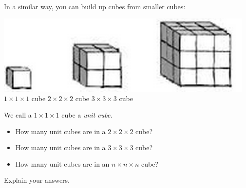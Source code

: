 \bigskip

In a similar way, you can build up cubes from smaller cubes:
\begin{center}
\includegraphics[height=4cm]{smallercubes}\\
$1\times1\times1$ cube
\qquad\quad
$2\times2\times2$ cube
\qquad\qquad\qquad\quad
$3\times3\times3$ cube
\qquad\qquad\qquad
\end{center}

\bigskip
\bigskip

\begin{thinkpair*}
We call a $1 \times 1 \times 1$ cube a \emph{unit cube}.
\begin{itemize}
\item
How many  unit cubes are in a $2\times 2\times 2$ cube?  \\

\item
How many  unit cubes are in a $3\times 3\times 3$ cube?  \\

\item
How many  unit cubes are in an $n\times n\times n$ cube?  \\

\end{itemize}
Explain your answers.
\end{thinkpair*}



\newpage 

